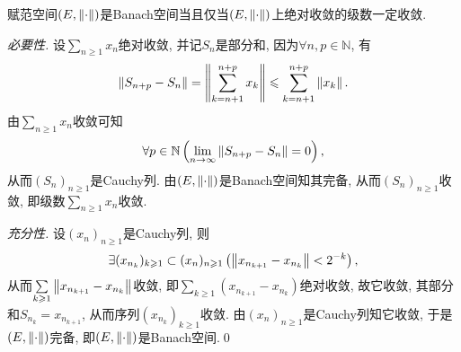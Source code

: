 	\begin{Theorem}
	赋范空间$ (E,\left\| \cdot \right\|) $是Banach空间当且仅当$ (E,\left\| \cdot \right\|) $上绝对收敛的级数一定收敛.
	\end{Theorem}
	\begin{Proof}
	\textsl{必要性.} 设$ \sum\limits_{n\geqslant 1}x_n $绝对收敛, 并记$ S_n $是部分和, 因为$ \forall n,p\in\mathbb{N} $, 有
	\[
	\left\| S_{n+p}-S_n \right\|=\left\| \sum_{k=n+1}^{n+p}x_k \right\|\leqslant\sum_{k=n+1}^{n+p}\left\| x_k \right\|.
	\]
	由$ \sum\limits_{n\geqslant 1}x_n $收敛可知
	\[
	\forall p\in\mathbb{N}\left(\lim_{n\to\infty}\left\| S_{n+p}-S_n \right\|=0\right),
	\]
	从而$ (S_n)_{n\geqslant 1} $是Cauchy列. 由$ (E,\left\| \cdot \right\|) $是Banach空间知其完备, 从而$ (S_n)_{n\geqslant 1} $收敛, 即级数$ \sum\limits_{n\geqslant 1}x_n $收敛.
	
	\textsl{充分性.} 设$ (x_n)_{n\geqslant 1} $是Cauchy列, 则
	\[
	\exists(x_{n_k})_{k\geqslant 1}\subset(x_n)_{n\geqslant 1}\left(\left\| x_{n_{k+1}}-x_{n_k} \right\|<2^{-k}\right),
	\]
	从而$ \sum\limits_{k\geqslant 1}\left\| x_{n_{k+1}}-x_{n_k} \right\| $收敛, 即$ \sum\limits_{k\geqslant 1}(x_{n_{k+1}}-x_{n_k}) $绝对收敛, 故它收敛, 其部分和$ S_{n_k}=x_{n_{k+1}} $, 从而序列$ (x_{n_k})_{k\geqslant 1} $收敛. 由$ (x_n)_{n\geqslant 1} $是Cauchy列知它收敛, 于是$ (E,\left\| \cdot \right\|) $完备, 即$ (E,\left\| \cdot \right\|) $是Banach空间.\qed
	\end{Proof}
	
